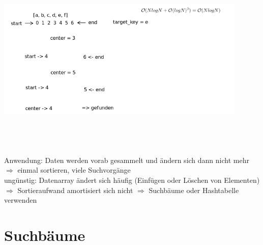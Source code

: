         \includegraphics[width=12cm,height=9cm,keepaspectratio]{./Pictures/binaereSuche.png}

        Anwendung: Daten werden vorab gesammelt und ändern sich dann nicht mehr\\
        $\Rightarrow$ einmal sortieren, viele Suchvorgänge\\

        ungünstig: Datenarray ändert sich häufig (Einfügen oder Löschen von Elementen)\\
        $\Rightarrow$ Sortieraufwand amortisiert sich nicht $\Rightarrow$ Suchbäume oder Hashtabelle verwenden

        \section{Suchbäume}


